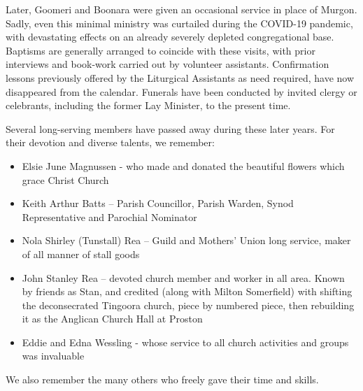 Later, Goomeri and Boonara were given an occasional service in place of Murgon. Sadly, even this minimal ministry was curtailed during the COVID-19 pandemic, with devastating effects on an already severely depleted congregational base. Baptisms are generally arranged to coincide with these visits, with prior interviews and book-work carried out by volunteer assistants. Confirmation lessons previously offered by the Liturgical Assistants as need required, have now disappeared from the calendar. Funerals have been conducted by invited clergy or celebrants, including the former Lay Minister, to the present time.



Several long-serving members have passed away during these later years. For their devotion and diverse talents, we remember:



\begin{itemize}

\item

  Elsie June Magnussen - who made and donated the beautiful flowers which grace Christ Church

\item

  Keith Arthur Batts -- Parish Councillor, Parish Warden, Synod Representative and Parochial Nominator

\item

  Nola Shirley (Tunstall) Rea -- Guild and Mothers' Union long service, maker of all manner of stall goods

\item

  John Stanley Rea -- devoted church member and worker in all area. Known by friends as Stan, and credited (along with Milton Somerfield) with shifting the deconsecrated Tingoora church, piece by numbered piece, then rebuilding it as the Anglican Church Hall at Proston

\item

  Eddie and Edna Wessling - whose service to all church activities and groups was invaluable

\end{itemize}



We also remember the many others who freely gave their time and skills.



